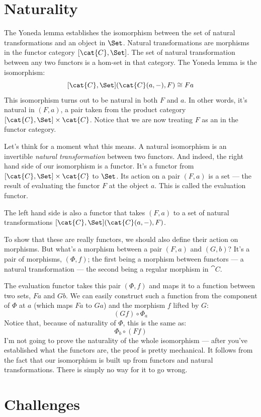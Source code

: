 \section{Naturality}

The Yoneda lemma establishes the isomorphism between the set of natural
transformations and an object in $\Set$. Natural transformations
are morphisms in the functor category $[\cat{C}, \Set]$. The set of
natural transformation between any two functors is a hom-set in that
category. The Yoneda lemma is the isomorphism:
\[[\cat{C}, \Set](\cat{C}(a, -), F) \cong F a\]
This isomorphism turns out to be natural in both $F$ and
$a$. In other words, it's natural in $(F, a)$, a pair
taken from the product category  $[\cat{C}, \Set] \times \cat{C}$. Notice
that we are now treating $F$ as an  in the functor
category.

Let's think for a moment what this means. A natural isomorphism is an
invertible \emph{natural transformation} between two functors. And
indeed, the right hand side of our isomorphism is a functor. It's a
functor from $[\cat{C}, \Set] \times \cat{C}$ to $\Set$. Its action on
a pair $(F, a)$ is a set --- the result of evaluating the
functor $F$ at the object $a$. This is called the
evaluation functor.

The left hand side is also a functor that takes $(F, a)$ to a
set of natural transformations $[\cat{C}, \Set](\cat{C}(a, -), F)$.

To show that these are really functors, we should also define their
action on morphisms. But what's a morphism between a pair
$(F, a)$ and $(G, b)$? It's a pair of morphisms,
$(\Phi, f)$; the first being a morphism between functors --- a
natural transformation --- the second being a regular morphism in
$\cat{C}$.

The evaluation functor takes this pair $(\Phi, f)$ and maps it to a
function between two sets, $F a$ and $G b$. We can
easily construct such a function from the component of $\Phi$ at
$a$ (which maps $F a$ to $G a$) and the morphism
$f$ lifted by $G$:
\[(G f) \circ \Phi_a\]
Notice that, because of naturality of $\Phi$, this is the same as:
\[\Phi_b \circ (F f)\]
I'm not going to prove the naturality of the whole isomorphism --- after
you've established what the functors are, the proof is pretty
mechanical. It follows from the fact that our isomorphism is built up
from functors and natural transformations. There is simply no way for it
to go wrong.

\section{Challenges}

